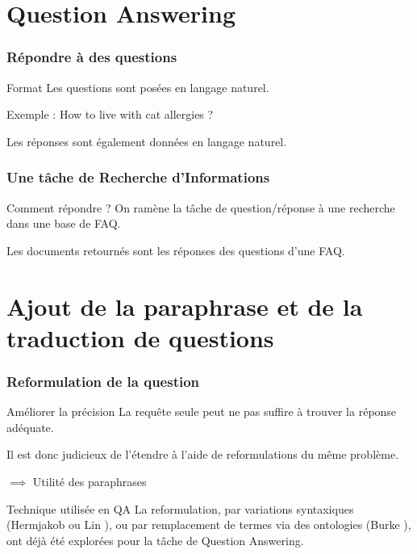 \documentclass[10pt]{beamer}
\begin{document}
\section{Question Answering}
\label{sec:QA}

\begin{frame}
  \frametitle{Répondre à des questions}
  \begin{block}{Format}
    Les questions sont posées en langage naturel.

    Exemple : How to live with cat allergies ?

    Les réponses sont également données en langage naturel.
  \end{block}
\end{frame}

\begin{frame}
  \frametitle{Une tâche de Recherche d'Informations}

  \begin{block}{Comment répondre ?}
    On ramène la tâche de question/réponse à une recherche dans une
    base de FAQ. 

    Les documents retournés sont les réponses des
    questions d'une FAQ.
  \end{block}
\end{frame}

\section{Ajout de la paraphrase et de la traduction de questions}
\label{sec:paratrans}

\begin{frame}
  \frametitle{Reformulation de la question}
  \begin{block}{Améliorer la précision}
  La requête seule peut ne pas suffire à trouver la réponse adéquate.
  
  Il est donc judicieux de l'étendre à l'aide de reformulations du même problème.
  
  $\implies$ Utilité des paraphrases
  \end{block}
  \pause

  \begin{block}{Technique utilisée en QA}
    La reformulation, par variations syntaxiques (Hermjakob
    \cite{Hermjakob02} ou Lin \cite{Lin01}), ou par remplacement de
    termes via des ontologies (Burke \cite{Burke97}), ont déjà été
    explorées pour la tâche de Question Answering.
  \end{block}
\end{frame}
\end{document}
